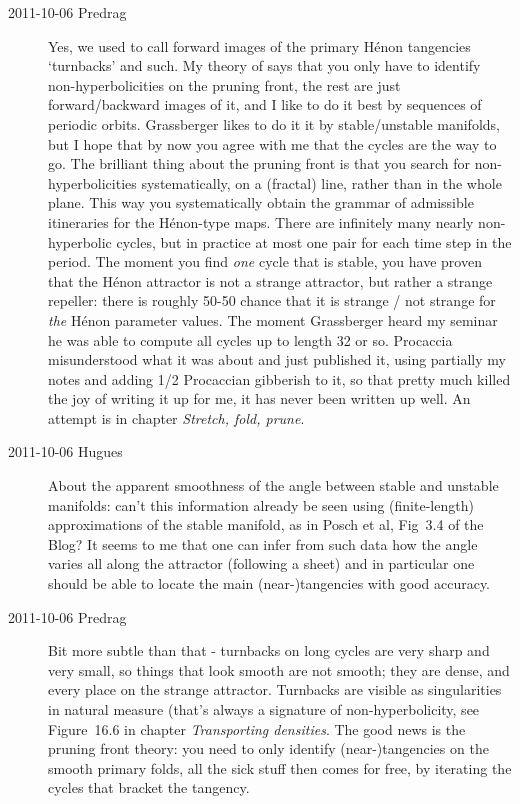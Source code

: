 \begin{description}
\item[2011-10-06 Predrag]
Yes, we used to call forward images of the primary H\'enon
tangencies `turnbacks' and such. My theory of 
says that you only have to identify non-hyperbolicities on the pruning front, the rest are just forward/backward images of it, and I like to do it best by sequences of periodic orbits.
Grassberger likes to do it it by stable/unstable manifolds, but I hope that by now you
agree with me that the cycles are the way to go. The brilliant thing about the pruning front
is that you search for non-hyperbolicities systematically,
on a (fractal) line, rather than in the whole plane. This way you systematically obtain
the grammar of admissible itineraries for the H\'enon-type maps. There are infinitely
many nearly non-hyperbolic cycles, but in practice at most one pair for each time step
in the period. The moment you find \emph{one} cycle that is stable,
you have proven that the H\'enon attractor is not a strange attractor, but rather a
strange repeller: there is roughly 50-50 chance that it is strange / not strange for
\emph{the} H\'enon parameter values.
The moment
Grassberger heard my seminar he was able to compute all cycles up to length 32 or so.
Procaccia misunderstood what it was about and just published it, using
partially my notes and adding 1/2
Procaccian gibberish to it, so that pretty much killed the joy of writing it up
for me, it has never been written up well. An attempt is in
chapter {\em Stretch, fold, prune}.

\item[2011-10-06 Hugues]
About the apparent smoothness of the angle between stable and unstable manifolds: can't this information already be seen using (finite-length) approximations of the stable manifold, as in Posch et al, Fig~3.4 of the Blog? It seems to me that one can infer from such data how the angle varies all along the attractor (following a sheet) and in particular one should be able to locate the main (near-)tangencies with good accuracy.

\item[2011-10-06 Predrag]
Bit more subtle than that - turnbacks on long cycles are very sharp and very small,
so things that look smooth are not smooth; they are dense, and every place on the
strange attractor. Turnbacks are visible as singularities in
natural measure (that's always a signature of non-hyperbolicity, see Figure~16.6
in 
chapter {\em Transporting densities}. The good news is the pruning front theory: you need
to only identify (near-)tangencies on the smooth primary folds, all the sick stuff then comes for free, by iterating the cycles that bracket the tangency.


\end{description}

\renewcommand{\ssp}{a}
